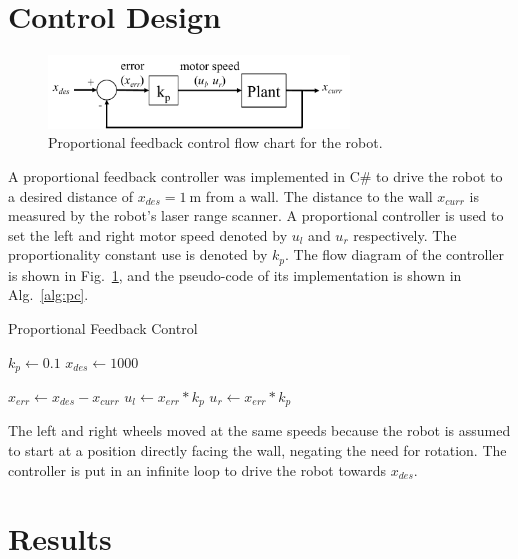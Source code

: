 \documentclass[conference]{IEEEtran}
\begin{document}
\section{Control Design}
%
\begin{figure}[h]
  \centering
  \includegraphics[width = 8cm]{figures/ControlDiagram}
  \caption{Proportional feedback control flow chart for the robot.}
  \label{fig:control}
\end{figure}
%
A proportional feedback controller was implemented in C\# to drive the robot to a desired
distance of $x_{des} =\SI{1}{\meter}$ from a wall. The distance to the wall
$x_{curr}$ is measured by the robot's laser range scanner. A proportional controller
is used to set the left and right motor speed denoted by $u_l$ and $u_r$ respectively. The
proportionality constant use is denoted by $k_p$. The flow diagram of the controller is
shown in Fig.~\ref{fig:control}, and the pseudo-code of its implementation is shown in
Alg.~\ref{alg:pc}.
%
\begin{algorithm}[b]
  \caption{Proportional Feedback Control}
  \begin{algorithmic}[1]
    \State $k_p \gets 0.1$
    \State $x_{des} \gets 1000$

    \medskip
    \State $x_{err} \gets x_{des}-x_{curr}$
    \medskip
    \State $u_l \gets x_{err} * k_{p}$
    \State $u_r \gets x_{err} * k_{p}$
    \EndWhile{}

    \end{algorithmic}
  \label{alg:pc}
\end{algorithm}

The left and right wheels moved at the same speeds because the robot is assumed to start
at a position directly facing the wall, negating the need for rotation. The controller is
put in an infinite loop to drive the robot towards $x_{des}$.

\addtolength{\textheight}{-14cm}

\section{Results}
\end{document}
